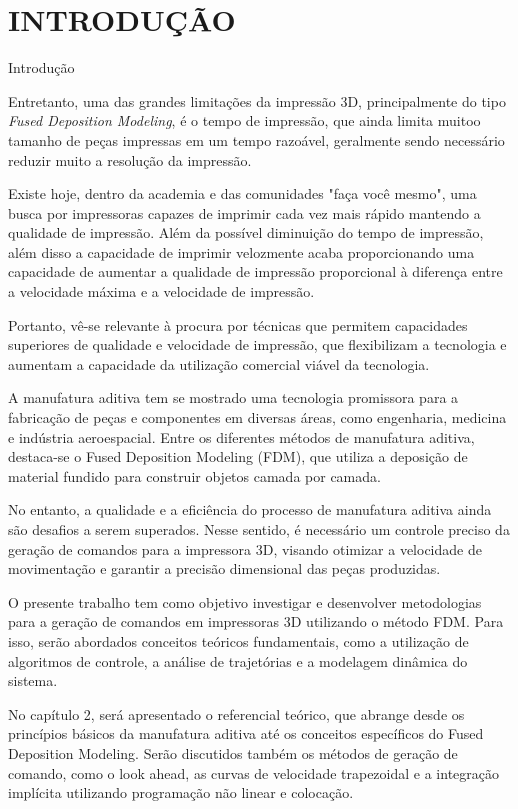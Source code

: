 \chapter{INTRODUÇÃO}

Introdução



Entretanto, uma das grandes limitações da impressão 3D, principalmente
do tipo \textit{Fused Deposition Modeling}, é o tempo de impressão, que ainda 
limita muitoo tamanho de peças impressas em um tempo razoável, 
geralmente sendo necessário reduzir muito a resolução da impressão.

Existe hoje, dentro da academia e das comunidades "faça você mesmo", uma busca por 
impressoras capazes de imprimir cada vez mais rápido mantendo a qualidade 
de impressão. Além  da possível diminuição do tempo de impressão, 
além disso a capacidade de imprimir velozmente acaba proporcionando 
uma capacidade de aumentar a qualidade de impressão proporcional à diferença
entre a velocidade máxima e a velocidade de impressão.

Portanto, vê-se  relevante à procura por técnicas que permitem capacidades 
superiores de qualidade e velocidade de impressão, que flexibilizam a 
tecnologia e aumentam a capacidade da utilização comercial viável da tecnologia.


A manufatura aditiva tem se mostrado uma tecnologia promissora para a fabricação de peças e componentes em diversas áreas, como engenharia, medicina e indústria aeroespacial. 
Entre os diferentes métodos de manufatura aditiva, destaca-se o Fused Deposition Modeling (FDM), 
que utiliza a deposição de material fundido para construir objetos camada por camada.

No entanto, a qualidade e a eficiência do processo de manufatura aditiva ainda são desafios a serem superados. 
Nesse sentido, é necessário um controle preciso da geração de comandos para a impressora 3D, visando otimizar 
a velocidade de movimentação e garantir a precisão dimensional das peças produzidas.

O presente trabalho tem como objetivo investigar e desenvolver metodologias para a geração de comandos em 
impressoras 3D utilizando o método FDM. Para isso, serão abordados conceitos teóricos fundamentais, como a 
utilização de algoritmos de controle, a análise de trajetórias e a modelagem dinâmica do sistema.

No capítulo 2, será apresentado o referencial teórico, que abrange desde os princípios básicos da 
manufatura aditiva até os conceitos específicos do Fused Deposition Modeling. Serão discutidos também os 
métodos de geração de comando, como o look ahead, as curvas de velocidade trapezoidal e a integração implícita
utilizando programação não linear e colocação.

